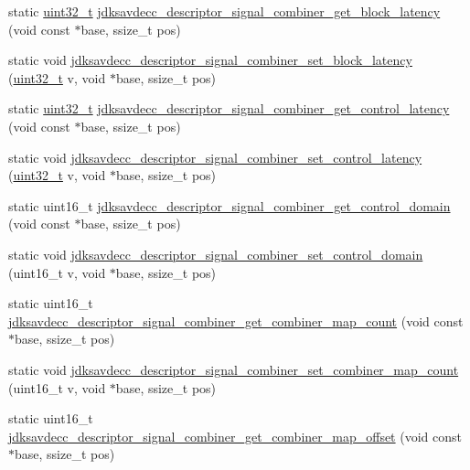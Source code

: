 \begin{DoxyCompactItemize}
\item 
static \hyperlink{parse_8c_a6eb1e68cc391dd753bc8ce896dbb8315}{uint32\+\_\+t} \hyperlink{group__descriptor__signal__combiner_ga37277f6de31f7f01d1ca0d389c5029df}{jdksavdecc\+\_\+descriptor\+\_\+signal\+\_\+combiner\+\_\+get\+\_\+block\+\_\+latency} (void const $\ast$base, ssize\+\_\+t pos)
\item 
static void \hyperlink{group__descriptor__signal__combiner_ga196d5482e33364493680cc44c7610eee}{jdksavdecc\+\_\+descriptor\+\_\+signal\+\_\+combiner\+\_\+set\+\_\+block\+\_\+latency} (\hyperlink{parse_8c_a6eb1e68cc391dd753bc8ce896dbb8315}{uint32\+\_\+t} v, void $\ast$base, ssize\+\_\+t pos)
\item 
static \hyperlink{parse_8c_a6eb1e68cc391dd753bc8ce896dbb8315}{uint32\+\_\+t} \hyperlink{group__descriptor__signal__combiner_ga9c745cf68552347afbba75780c89c69b}{jdksavdecc\+\_\+descriptor\+\_\+signal\+\_\+combiner\+\_\+get\+\_\+control\+\_\+latency} (void const $\ast$base, ssize\+\_\+t pos)
\item 
static void \hyperlink{group__descriptor__signal__combiner_gaa157902fa0e69bd84f8f6d3d8d29c094}{jdksavdecc\+\_\+descriptor\+\_\+signal\+\_\+combiner\+\_\+set\+\_\+control\+\_\+latency} (\hyperlink{parse_8c_a6eb1e68cc391dd753bc8ce896dbb8315}{uint32\+\_\+t} v, void $\ast$base, ssize\+\_\+t pos)
\item 
static uint16\+\_\+t \hyperlink{group__descriptor__signal__combiner_gaec4582bf349338f72363141362026a54}{jdksavdecc\+\_\+descriptor\+\_\+signal\+\_\+combiner\+\_\+get\+\_\+control\+\_\+domain} (void const $\ast$base, ssize\+\_\+t pos)
\item 
static void \hyperlink{group__descriptor__signal__combiner_ga5a50c191fd5c89621c4014c6f3b731c6}{jdksavdecc\+\_\+descriptor\+\_\+signal\+\_\+combiner\+\_\+set\+\_\+control\+\_\+domain} (uint16\+\_\+t v, void $\ast$base, ssize\+\_\+t pos)
\item 
static uint16\+\_\+t \hyperlink{group__descriptor__signal__combiner_gadd2493df0c6bf2a2d504206a637e1903}{jdksavdecc\+\_\+descriptor\+\_\+signal\+\_\+combiner\+\_\+get\+\_\+combiner\+\_\+map\+\_\+count} (void const $\ast$base, ssize\+\_\+t pos)
\item 
static void \hyperlink{group__descriptor__signal__combiner_ga4d89c332e69f8dd38afd3851a477ef39}{jdksavdecc\+\_\+descriptor\+\_\+signal\+\_\+combiner\+\_\+set\+\_\+combiner\+\_\+map\+\_\+count} (uint16\+\_\+t v, void $\ast$base, ssize\+\_\+t pos)
\item 
static uint16\+\_\+t \hyperlink{group__descriptor__signal__combiner_ga963a17fce7f7ebbf44a22e78faff4e69}{jdksavdecc\+\_\+descriptor\+\_\+signal\+\_\+combiner\+\_\+get\+\_\+combiner\+\_\+map\+\_\+offset} (void const $\ast$base, ssize\+\_\+t pos)

\end{DoxyCompactItemize}
